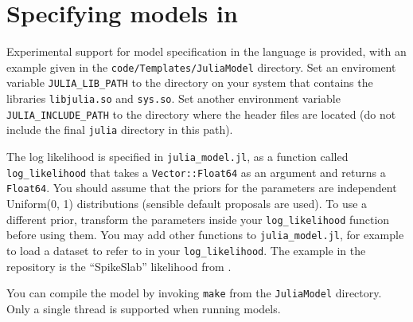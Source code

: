 \documentclass[article, nojss]{jss}
\begin{document}


\section[Specifying models in Julia]{Specifying models in }
Experimental support for model specification in the
 language \citep{julia}
is provided, with an example given in the
{\tt code/Templates/JuliaModel} directory.
Set an enviroment variable {\tt JULIA\_LIB\_PATH} to the directory on your
system that contains the libraries {\tt libjulia.so} and
{\tt sys.so}. Set another environment variable {\tt JULIA\_INCLUDE\_PATH}
to the directory where the  header files are located
(do not include the final {\tt julia} directory in this path).

The log likelihood is specified in {\tt julia\_model.jl}, as a function
called {\tt log\_likelihood} that takes a {\tt Vector::Float64} as an argument
and returns a {\tt Float64}. You should assume that the priors for the
parameters are independent Uniform(0, 1) distributions (sensible default
proposals are used). To use a different prior, transform the parameters inside
your {\tt log\_likelihood} function before using them.
You may add other functions to {\tt julia\_model.jl}, for example to load
a dataset to refer to in your {\tt log\_likelihood}. The example in
the repository is the ``SpikeSlab'' likelihood from
\citet{brewer2011diffusive}.

You can compile the model by invoking {\tt make}
from the {\tt JuliaModel} directory.
Only a single thread is supported when running 
models.
\end{document}
